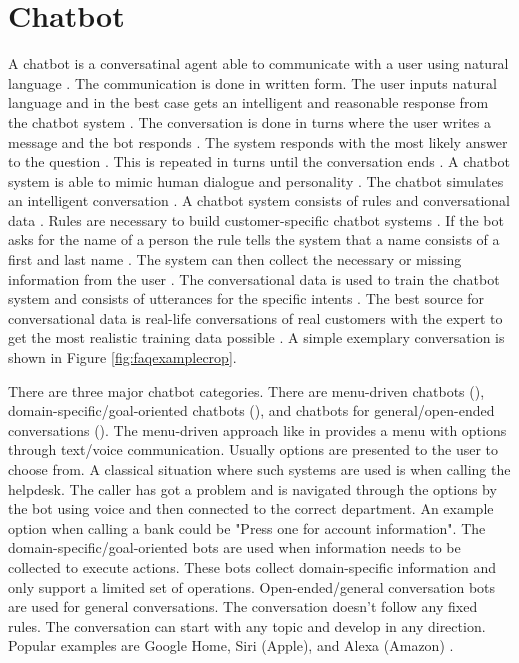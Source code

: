 \section{Chatbot}
A chatbot is a conversatinal agent able to communicate with a user using natural language \cite{evaluateChatbotsShawar2007, shawar2007chatbots, huang2007extracting, gregori2017evaluation}.
The communication is done in written form.
The user inputs natural language and in the best case gets an intelligent and reasonable response 
from the chatbot system \cite{vrajitoru2004evolutionary}. 
The conversation is done in turns where the user writes a message and the bot responds \cite{evaluateChatbotsShawar2007, shawar2007chatbots}.
The system responds with the most likely answer to the question \cite{dutta2017developing}.
This is repeated in turns until the conversation ends \cite{vrajitoru2004evolutionary}.
A chatbot system is able to mimic human dialogue and personality \cite{kane2016role, dutta2017developing}.
The chatbot simulates an intelligent conversation \cite{vrajitoru2004evolutionary}.
A chatbot system consists of rules and conversational data \cite{singhbuilding}.
Rules are necessary to build customer-specific chatbot systems \cite{singhbuilding}. 
If the bot asks for the name of a person the rule tells the system that a name consists of a first and last name \cite{singhbuilding}. The system can then collect the necessary or missing information from the user \cite{singhbuilding}.
The conversational data is used to train the chatbot system and consists of utterances for the specific intents \cite{singhbuilding}.
The best source for conversational data is real-life conversations of real customers with the expert to get the most realistic training data possible \cite{singhbuilding}.
A simple exemplary conversation is shown in Figure \ref{fig:faqexamplecrop}.

There are three major chatbot categories.
There are menu-driven chatbots (\citet{singhbuilding}), domain-specific/goal-oriented chatbots (\citet{deshpande2017survey, luis2015williams, braunEvaluatingNLU, williams2017hybrid}),
and chatbots for general/open-ended conversations (\citet{brandtzaeg2018chatbots, singhbuilding}).
The menu-driven approach like in \citet{singhbuilding} provides a menu with options through text/voice communication.
Usually options are presented to the user to choose from. 
A classical situation where such systems are used is when calling the helpdesk.
The caller has got a problem and is navigated through the options by the bot using voice and then connected to the correct department.
An example option when calling a bank could be "Press one for account information".
The domain-specific/goal-oriented bots are used when information needs to be collected to execute actions.
These bots collect domain-specific information and only support a limited set of operations.
Open-ended/general conversation bots are used for general conversations.
The conversation doesn't follow any fixed rules. The conversation can start with any topic and develop in any direction.
Popular examples are Google Home, Siri (Apple), and Alexa (Amazon) \cite{singhbuilding}.


